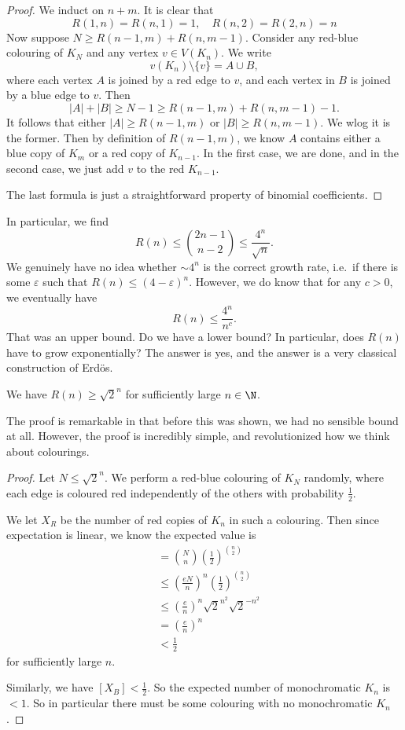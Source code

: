 \documentclass[a4paper]{article}
\begin{document}
\begin{proof}
  We induct on $n + m$. It is clear that
  \[
    R(1, n) = R(n, 1) = 1,\quad R(n, 2) = R(2, n) = n
  \]
  Now suppose $N \geq R(n - 1, m) + R(n, m - 1)$. Consider any red-blue colouring of $K_N$ and any vertex $v \in V(K_n)$. We write
  \[
    v(K_n) \setminus \{v\} = A \cup B,
  \]
  where each vertex $A$ is joined by a red edge to $v$, and each vertex in $B$ is joined by a blue edge to $v$. Then
  \[
    |A| + |B| \geq N - 1 \geq R(n - 1, m) + R(n, m - 1) - 1.
  \]
  It follows that either $|A| \geq R(n - 1, m)$ or $|B| \geq R(n, m - 1)$. We wlog it is the former. Then by definition of $R(n - 1, m)$, we know $A$ contains either a blue copy of $K_m$ or a red copy of $K_{n - 1}$. In the first case, we are done, and in the second case, we just add $v$ to the red $K_{n - 1}$.

  The last formula is just a straightforward property of binomial coefficients.
\end{proof}

In particular, we find
\[
  R(n) \leq \binom{2n - 1}{n - 2} \leq \frac{4^n}{\sqrt{n}}.
\]
We genuinely have no idea whether $\sim 4^n$ is the correct growth rate, i.e.\ if there is some $\varepsilon$ such that $R(n) \leq (4 - \varepsilon)^n$. However, we do know that for any $c > 0$, we eventually have
\[
  R(n) \leq \frac{4^n}{n^c}.
\]
That was an upper bound. Do we have a lower bound? In particular, does $R(n)$ have to grow exponentially? The answer is yes, and the answer is a very classical construction of Erd\"os.

\begin{thm}
  We have $R(n) \geq \sqrt{2}^n$ for sufficiently large $n \in \N$.
\end{thm}
The proof is remarkable in that before this was shown, we had no sensible bound at all. However, the proof is incredibly simple, and revolutionized how we think about colourings.

\begin{proof}
  Let $N \leq \sqrt{2}^n$. We perform a red-blue colouring of $K_N$ randomly, where each edge is coloured red independently of the others with probability $\frac{1}{2}$.

  We let $X_R$ be the number of red copies of $K_n$ in such a colouring. Then since expectation is linear, we know the expected value is
  \begin{align*}
    [X_R] &= \binom{N}{n} \left(\frac{1}{2}\right)^{\binom{n}{2}}\\
    &\leq \left(\frac{eN}{n}\right)^n \left(\frac{1}{2}\right)^{\binom{n}{2}}\\
    &\leq \left(\frac{e}{n}\right)^n \sqrt{2}^{n^2} \sqrt{2}^{-n^2}\\
    &= \left(\frac{e}{n}\right)^{n}\\
    &< \frac{1}{2}
  \end{align*}
  for sufficiently large $n$.

  Similarly, we have $[X_B] < \frac{1}{2}$. So the expected number of monochromatic $K_n$ is $< 1$. So in particular there must be some colouring with no monochromatic $K_n$.
\end{proof}
\end{document}

